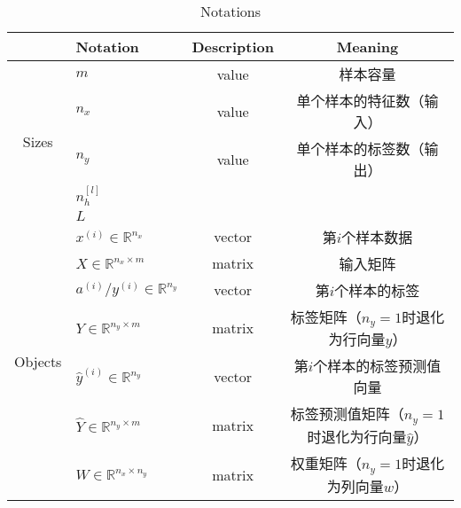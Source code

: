 \begin{table}[h]
	\centering
	\begin{threeparttable}
	\caption{Notations}
	\begin{tabular}{clcc}
		\hline
									& \textbf{Notation}                         & \textbf{Description} & \textbf{Meaning}                                                   \\ \hline
		\multirow{5}{*}{Sizes}      & $m$                                       & value                & 样本容量                                                               \\
									& $n_x$                                     & value                & 单个样本的特征数（输入）                                                \\
									& $n_y$                                     & value                & 单个样本的标签数（输出）                                                \\
									& $n_h^{[l]}$                               &                      &                                                                    \\
									& $L$                                       &                      &                                                                    \\ \hline
		\multirow{9}{*}{Objects}    & $x^{(i)} \in \mathbb{R}^{n_x}$            & vector               & 第$i$个样本数据                                                          \\
									& $X \in {\mathbb{R}^{n_x \times m}}$       & matrix               & 输入矩阵                                                               \\
									& $a^{(i)} / y^{(i)} \in \mathbb{R}^{n_y}$  & vector               & 第$i$个样本的标签                                                         \\
									& $Y \in {\mathbb{R}^{n_y \times m}}$       & matrix               & 标签矩阵（$n_y=1$时退化为行向量$y$）                                    \\									
									& $\hat{y}^{(i)} \in \mathbb{R}^{n_y}$      & vector               & 第$i$个样本的标签预测值向量                                                \\
									& $\hat{Y} \in {\mathbb{R}^{n_y \times m}}$ & matrix               & 标签预测值矩阵（$n_y=1$时退化为行向量$\hat{y}$）   						\\
									& $W \in \mathbb{R}^{n_x \times n_y}$       & matrix               & 权重矩阵（$n_y=1$时退化为列向量$w$）                                    \\

\end{tabular}
\end{threeparttable}
\end{table}
